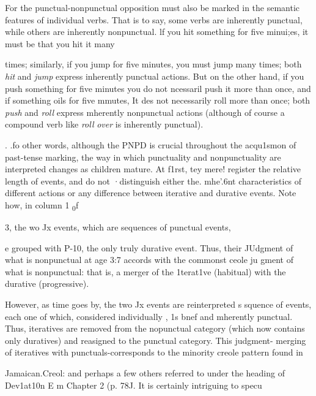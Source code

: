 For the punctual-nonpunctual opposition must also be marked in the semantic features of individual verbs. That is to say, some verbs are inherently punctual, while others are inherently nonpunctual. lf you hit something for five minui;es, it must be that you hit it many


times; similarly, if you jump for five minutes, you must jump many times; both \textit{hit} and \textit{jump} express inherently punctual actions. But on the other hand, if you push something for five minutes you do not ncessaril push it more than once, and if something oils for five mmutes, It des not necessarily roll more than once; both \textit{push} and \textit{roll} express mherently nonpunctual actions (although of course a compound verb like \textit{roll} \textit{over} is inherently punctual).

. .fo other words, although the PNPD is crucial throughout the acqu1smon of past-tense marking, the way in which punctuality and nonpunctuality are interpreted changes as children mature. At f1rst, tey mere! register the relative length of events, and do not ·distinguish either the. mhe'.{\textquotedbl}6nt characteristics of different actions or any difference between iterative and durative events. Note how, in column 1 \textsubscript{0}f

\begin{table}
\caption{3, the wo Jx events, which are sequences of punctual events,}
\label{tab:3}
\end{table}

e grouped with P-10, the only truly durative event. Thus, their JUdgment of what is nonpunctual at age 3:7 accords with the common\-st ceole ju gment of what is nonpunctual: that is, a merger of the 1terat1ve (habitual) with the durative (progressive).

However, as time goes by, the two Jx events are reinterpreted s squence of events, each one of which, considered individually , 1s bnef and mherently punctual. Thus, iteratives are removed from the nopunctual category (which now contains only duratives) and re\-asigned to the punctual category. This judgment- merging of iteratives with punctuals-corresponds to the minority creole pattern found in

Jamaican.Creol: and perhaps a few others referred to under the heading of Dev1at10n E m Chapter 2 (p. 78J. It is certainly intriguing to specu\-

